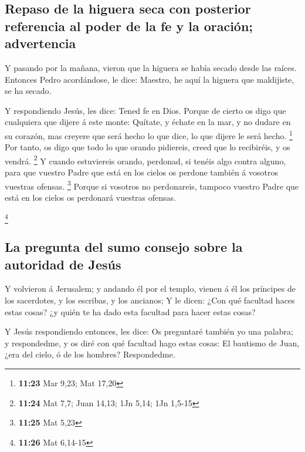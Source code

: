 \hypertarget{repaso-de-la-higuera-seca-con-posterior-referencia-al-poder-de-la-fe-y-la-oraciuxf3n-advertencia}{%
\subsection{Repaso de la higuera seca con posterior referencia al poder
de la fe y la oración;
advertencia}\label{repaso-de-la-higuera-seca-con-posterior-referencia-al-poder-de-la-fe-y-la-oraciuxf3n-advertencia}}

 Y pasando por la mañana, vieron que la higuera se había
secado desde las raíces.  Entonces Pedro acordándose, le
dice: Maestro, he aquí la higuera que maldijiste, se ha secado.

 Y respondiendo Jesús, les dice: Tened fe en Dios.
 Porque de cierto os digo que cualquiera que dijere á este
monte: Quítate, y échate en la mar, y no dudare en su corazón, mas
creyere que será hecho lo que dice, lo que dijere le será hecho.
\footnote{\textbf{11:23} Mar 9,23; Mat 17,20}  Por tanto,
os digo que todo lo que orando pidiereis, creed que lo recibiréis, y os
vendrá. \footnote{\textbf{11:24} Mat 7,7; Juan 14,13; 1Jn 5,14; 1Jn
  1,5-15}  Y cuando estuviereis orando, perdonad, si tenéis
algo contra alguno, para que vuestro Padre que está en los cielos os
perdone también á vosotros vuestras ofensas. \footnote{\textbf{11:25}
  Mat 5,23}  Porque si vosotros no perdonareis, tampoco
vuestro Padre que está en los cielos os perdonará vuestras ofensas.

\footnote{\textbf{11:26} Mat 6,14-15}

\hypertarget{la-pregunta-del-sumo-consejo-sobre-la-autoridad-de-jesuxfas}{%
\subsection{La pregunta del sumo consejo sobre la autoridad de
Jesús}\label{la-pregunta-del-sumo-consejo-sobre-la-autoridad-de-jesuxfas}}

 Y volvieron á Jerusalem; y andando él por el templo,
vienen á él los príncipes de los sacerdotes, y los escribas, y los
ancianos;  Y le dicen: ¿Con qué facultad haces estas cosas?
¿y quién te ha dado esta facultad para hacer estas cosas?

 Y Jesús respondiendo entonces, les dice: Os preguntaré
también yo una palabra; y respondedme, y os diré con qué facultad hago
estas cosas:  El bautismo de Juan, ¿era del cielo, ó de los
hombres? Respondedme.


